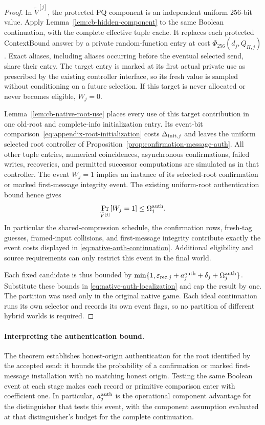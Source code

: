 \begin{proof}
In $\widetilde V^{[j]}$, the protected PQ component is an independent uniform
256-bit value.  Apply Lemma~\ref{lem:cb-hidden-component} to the same Boolean
continuation, with the complete effective tuple cache.  It replaces each
protected ContextBound answer by a private random-function entry at cost
$\Phi_{256}(d_j,Q_{H,j})$.  Exact aliases, including aliases occurring before
the eventual selected send, share their entry.  The target entry is marked
at its first actual private use as prescribed by the existing controller
interface, so its fresh value is sampled without conditioning on a future
selection.  If this target is never allocated or never becomes eligible,
$W_j=0$.

Lemma~\ref{lem:cb-native-root-use} places every use of this target contribution
in one old-root and complete-info initialization entry.  Its event-bit
comparison~\eqref{eq:appendix-root-initialization} costs
$\Delta_{{\rm init},j}$ and leaves the uniform selected root controller of
Proposition~\ref{prop:confirmation-message-auth}.  All other tuple
entries, numerical coincidences, asynchronous confirmations, failed writes,
recoveries, and permitted successor computations are simulated as in that
controller.  The event $W_j=1$ implies an instance of its selected-root
confirmation or marked first-message integrity event.  The existing
uniform-root authentication bound hence gives
\[
 \Pr_{\widetilde V^{[j]}}[W_j=1]
 \le\Omega_j^{\rm auth}.
\]
In particular the shared-compression schedule, the confirmation rows,
fresh-tag guesses, framed-input collisions, and first-message integrity
contribute exactly the event costs displayed in
\eqref{eq:native-auth-continuation}.  Additional eligibility and source
requirements can only restrict this event in the final world.

Each fixed candidate is thus bounded by
$\min\{1,\varepsilon_{{\rm rec},j}+a_j^{\rm auth}+\delta_j
+\Omega_j^{\rm auth}\}$.  Substitute these bounds in
\eqref{eq:native-auth-localization} and cap the result by one.  The partition
was used only in the original native game.  Each ideal continuation runs its
own selector and records its own event flags, so no partition of different
hybrid worlds is required.
\end{proof}

\paragraph{Interpreting the authentication bound.}
The theorem establishes honest-origin authentication for the root
identified by the accepted send: it bounds the probability of a confirmation
or marked first-message installation with no matching honest origin.
Testing the same Boolean event at each stage makes each record or primitive comparison
enter with coefficient one. In particular, $a_j^{\rm auth}$ is the
operational component advantage for the distinguisher that tests this
event, with the component assumption evaluated at that distinguisher's
budget for the complete continuation.
